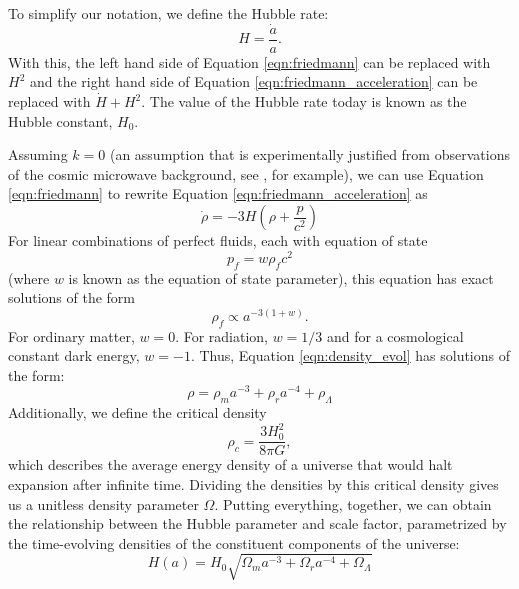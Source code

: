 To simplify our notation, we define the Hubble rate:
$$H=\frac{\dot{a}}{a}.$$
With this, the left hand side of Equation \ref{eqn:friedmann} can be replaced with $H^2$ and the right hand side of Equation \ref{eqn:friedmann_acceleration} can be replaced with $\dot{H} + H^2$.  The value of the Hubble rate today is known as the Hubble constant, $H_0$.

Assuming $k=0$ (an assumption that is experimentally justified from observations of the cosmic microwave background, see \citet{planck_collaboration_planck_2016}, for example), we can use Equation \ref{eqn:friedmann} to rewrite Equation \ref{eqn:friedmann_acceleration} as
\begin{equation}
    \dot{\rho} = -3H\left(\rho + \frac{p}{c^2}\right)
    \label{eqn:density_evol}
\end{equation}
For linear combinations of perfect fluids, each with equation of state
$$p_f = w\rho_f c^2$$
(where $w$ is known as the equation of state parameter), this equation has exact solutions of the form
$$\rho_f \propto a^{-3(1+w)}.$$
For ordinary matter, $w=0$. For radiation, $w=1/3$ and for a cosmological constant dark energy, $w=-1$. Thus, Equation \ref{eqn:density_evol} has solutions of the form:
$$\rho = \rho_m a^{-3} + \rho_r a^{-4} + \rho_\Lambda$$
Additionally, we define the critical density
$$\rho_{c} = \frac{3H_0^2}{8\pi G},$$
which describes the average energy density of a universe that would halt expansion after infinite time. Dividing the densities by this critical density gives us a unitless density parameter $\Omega$. Putting everything, together, we can obtain the relationship between the Hubble parameter and scale factor, parametrized by the time-evolving densities of the constituent components of the universe:
\begin{equation}
    H(a) = H_0\sqrt{\Omega_m a^{-3} + \Omega_r a^{-4} + \Omega_\Lambda}
    \label{eqn:hubble_vs_a}
\end{equation}

